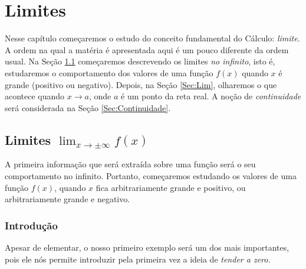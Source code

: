 

\chapter{Limites}\label{Cap:Limites}

\ifdefined\updateans
\fi

Nesse capítulo começaremos o estudo do conceito fundamental do Cálculo:
\emph{limite}.\\

A ordem na qual a matéria é apresentada aqui é um pouco diferente 
da ordem usual. Na Seção \ref{Sec:Limnoinf} 
começaremos descrevendo os limites \emph{no infinito}, isto é, estudaremos 
o comportamento dos valores de uma função $f(x)$ 
quando $x$ é grande (positivo ou negativo).
Depois, na Seção \ref{Sec:Lim}, olharemos o que acontece 
quando $x\to a$, onde $a$ é um ponto da reta real.
A noção de \emph{continuidade} será considerada na Seção 
\ref{Sec:Continuidade}.

\section{Limites $\lim_{x\to \pm \infty}f(x)$}\label{Sec:Limnoinf}

A primeira informação que será extraída sobre uma função será o seu
comportamento no infinito. 
Portanto, 
começaremos estudando os valores de uma função $f(x)$, quando $x$
fica
arbitrariamente grande e positivo, ou arbitrariamente grande e
negativo.

\subsection{Introdução}
Apesar de elementar, o nosso primeiro exemplo será um dos mais
importantes, pois ele nós permite introduzir pela primeira vez a
ideia de \emph{tender a zero}.

